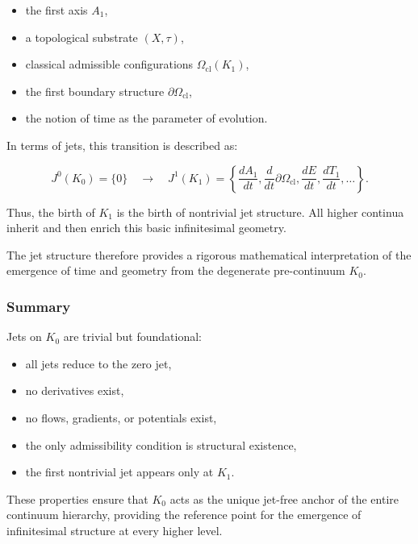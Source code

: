 \begin{itemize}
    \item the first axis $A_1$,
    \item a topological substrate $(X,\tau)$,
    \item classical admissible configurations $\Omega_{\mathrm{cl}}(K_1)$,
    \item the first boundary structure $\partial\Omega_{\mathrm{cl}}$,
    \item the notion of time as the parameter of evolution.
\end{itemize}

In terms of jets, this transition is described as:

\begin{equation}
J^0(K_0) = \{0\}
\quad \longrightarrow \quad
J^1(K_1) =
\left\{
\frac{dA_1}{dt},
\frac{d}{dt}\partial\Omega_{\mathrm{cl}},
\frac{dE}{dt},
\frac{dT_1}{dt},
\ldots
\right\}.
\end{equation}

Thus, the birth of $K_1$ is the birth of nontrivial jet structure.
All higher continua inherit and then enrich this basic infinitesimal
geometry.

The jet structure therefore provides a rigorous mathematical
interpretation of the emergence of time and geometry from the degenerate
pre-continuum $K_0$.



\subsubsection{Summary}

Jets on $K_0$ are trivial but foundational:

\begin{itemize}
    \item all jets reduce to the zero jet,
    \item no derivatives exist,
    \item no flows, gradients, or potentials exist,
    \item the only admissibility condition is structural existence,
    \item the first nontrivial jet appears only at $K_1$.
\end{itemize}

These properties ensure that $K_0$ acts as the unique jet-free anchor of
the entire continuum hierarchy, providing the reference point for the
emergence of infinitesimal structure at every higher level.
